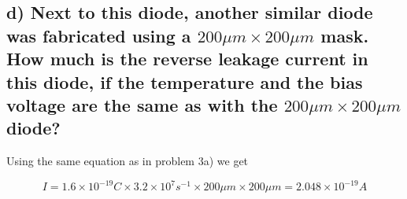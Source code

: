 \subsection*{d) Next to this diode, another similar diode was fabricated using a $200 \mu m \times 200 \mu m$
mask. How much is the reverse leakage current in this diode, if the temperature
and the bias voltage are the same as with the $200 \mu m \times 200 \mu m$ diode?}

Using the same equation as in problem 3a) we get

\begin{equation*}
    I=1.6 \times 10^{-19} C \times 3.2 \times 10^7 s^{-1} \times 200 \mu m \times 200 \mu m = 2.048\times 10^{-19} A
\end{equation*}

